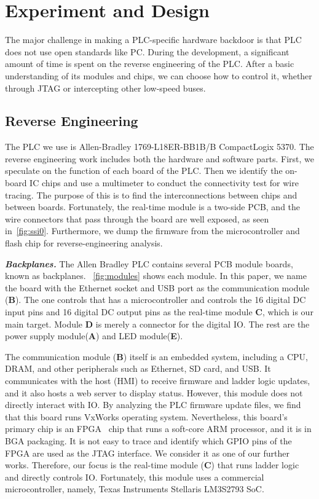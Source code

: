 \section{Experiment and Design}
\label{sec:implant-experiment}


The major challenge in making a PLC-specific hardware backdoor is that PLC does not use open standards like PC.  During the development, a significant amount of time is spent on the reverse engineering of the PLC. After a basic understanding of its modules and chips, we can choose how to control it, whether through JTAG or intercepting other low-speed buses.


\subsection{Reverse Engineering}
The PLC we use is Allen-Bradley 1769-L18ER-BB1B/B CompactLogix 5370.
The reverse engineering work includes both the hardware and software parts. First, we speculate on the function of each board of the PLC. Then we identify the on-board IC chips and use a multimeter to conduct the connectivity test for wire tracing. The purpose of this is to find the interconnections between chips and between boards. Fortunately, the real-time module is a two-side PCB, and the wire connectors that pass through the board are well exposed, as seen in~\autoref{fig:ssi0}. Furthermore, we dump the firmware from the microcontroller and flash chip for reverse-engineering analysis.


\textbf{\textit{Backplanes.}} The Allen Bradley PLC contains several PCB module boards, known as backplanes. ~\autoref{fig:modules} shows each module. In this paper, we name the board with the Ethernet socket and USB port as the communication module (\textbf{B}).  The one controls that has a microcontroller and controls the 16 digital DC input pins and 16 digital DC output pins as the real-time module {\textbf{C}}, which is our main target. Module \textbf{D} is merely a connector for the digital IO. The rest are the power supply module(\textbf{A}) and LED module(\textbf{E}).


The communication module (\textbf{B}) itself is an embedded system, including a CPU, DRAM, and other peripherals such as Ethernet, SD card, and USB.  It communicates with the host (HMI) to receive firmware and ladder logic updates, and it also hosts a web server to display status. However, this module does not directly interact with IO. By analyzing the PLC firmware update files, we find that this board runs VxWorks operating system. Nevertheless, this board's primary chip is an FPGA~\cite{kuon2008fpga} chip that runs a soft-core ARM processor, and it is in BGA packaging. It is not easy to trace and identify which GPIO pins of the FPGA are used as the JTAG interface. We consider it as one of our further works. Therefore, our focus is the real-time module (\textbf{C}) that runs ladder logic and directly controls IO. Fortunately, this module uses a commercial microcontroller, namely, Texas Instruments Stellaris LM3S2793 SoC.

